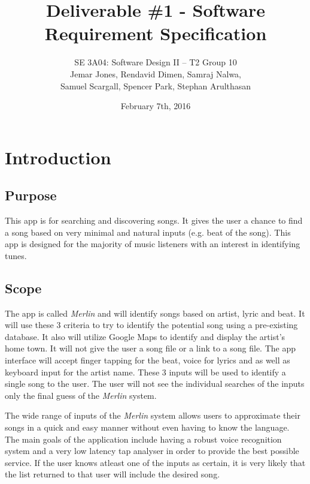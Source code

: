 \documentclass[]{article}
\newcommand{\merlin}{\textit{Merlin }}
\begin{document}
\begin{titlepage}
\title{Deliverable \#1 - Software Requirement Specification}
\author{
	SE 3A04: Software Design II -- T2 Group 10\\
  	Jemar Jones, Rendavid Dimen, Samraj Nalwa, \\
  	Samuel Scargall, Spencer Park, Stephan Arulthasan
}
\date{February 7th, 2016}
\maketitle
\end{titlepage}

\newpage

\tableofcontents
\listoftables
\listoffigures

\section{Introduction}
\label{sec:introduction}

\subsection{Purpose}
\label{sub:purpose}
	This app is for searching and discovering songs. It gives the user a chance to find a song based on very minimal and natural inputs (e.g. beat of the song). This app is designed for the majority of music listeners with an interest in identifying tunes.

\subsection{Scope}
\label{sub:scope}
The app is called \merlin and will identify songs based on artist, lyric and beat. It will use these 3 criteria to try to identify the potential song using a pre-existing database. It also will utilize Google Maps to identify and display the artist’s home town. It will not give the user a song file or a link to a song file. The app interface will accept finger tapping for the beat, voice for lyrics and as well as keyboard input for the artist name. These 3 inputs will be used to identify a single song to the user. The user will not see the individual searches of the inputs only the final guess of the \merlin system.

The wide range of inputs of the \merlin system allows users to approximate their songs in a quick and easy manner without even having to know the language. The main goals of the application include having a robust voice recognition system and a very low latency tap analyser in order to provide the best possible service. If the user knows atleast one of the inputs as certain, it is very likely that the list returned to that user will include the desired song. 
\end{document}
